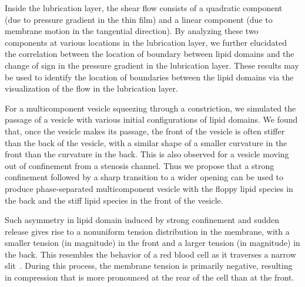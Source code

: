 \documentclass[twoside,twocolumn,9pt]{article}
\begin{document}
Inside the lubrication layer, the shear flow consists of a quadratic
component (due to pressure gradient in the thin film) and a linear
component (due to membrane motion in the tangential direction). By
analyzing these two components at various locations in the lubrication
layer, we further elucidated the correlation between the location of
boundary between lipid domains and the change of
sign in the pressure gradient in the lubrication layer. These results
may be used to identify the location of boundaries between the lipid
domains via the visualization of the flow in the lubrication layer.

For a multicomponent vesicle squeezing through a constriction, we
simulated the passage of a vesicle with various initial configurations
of lipid domains. We found that, once the vesicle makes its passage, the
front of the vesicle is often stiffer than the back of the vesicle, with
a similar shape of a smaller curvature in the front than the curvature
in the back. This is also observed for a vesicle moving out of
confinement from a stenosis channel. Thus we propose that a strong
confinement followed by a sharp transition to a wider opening can be
used to produce phase-separated multicomponent vesicle with the floppy
lipid species in the back and the stiff lipid species in the front of
the vesicle.

Such asymmetry in lipid domain induced by strong confinement and sudden
release gives rise to a nonuniform tension distribution in the membrane,
with a smaller tension (in magnitude) in the front and a larger tension
(in magnitude) in the back. This resembles the behavior of a red blood
cell as it traverses a narrow slit~\cite{LuPeng2019_PoF,
wu2015critical}. During this process, the membrane tension is primarily
negative, resulting in compression that is more pronounced at the rear
of the cell than at the front.
\end{document}
